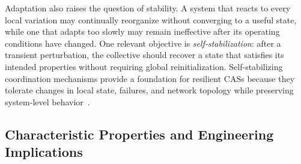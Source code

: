 Adaptation also raises the question of stability. 
%
A system that reacts to every local variation 
 may continually reorganize  without converging to a useful state,
 while one that adapts too slowly may remain ineffective after 
 its operating conditions have changed. 
%
One relevant objective is \emph{self-stabilization}:
 after a transient perturbation, the collective should recover a state that satisfies 
 its intended properties without requiring global reinitialization.
%
Self-stabilizing coordination mechanisms provide a foundation for resilient \glspl{CAS}
 because they tolerate changes in local state, failures, and network topology
 while preserving system-level behavior~\cite{DBLP:journals/tomacs/ViroliABDP18}.

\subsection{Characteristic Properties and Engineering Implications}
\label{subsec:cas-properties}




